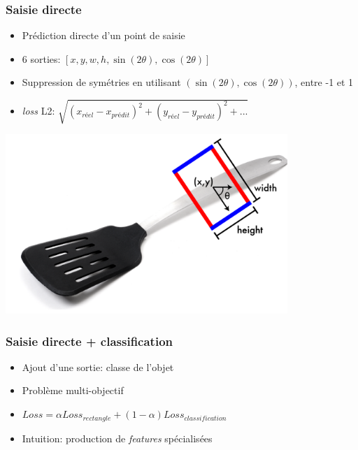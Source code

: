 \documentclass{beamer}
\begin{document}
\begin{frame}
  \frametitle{Saisie directe}
  \begin{itemize}
  \item Prédiction directe d'un point de saisie
  \item 6 sorties: $[x, y, w, h, \sin(2\theta), \cos(2\theta)]$
  \item Suppression de symétries en utilisant $(\sin(2\theta), \cos(2\theta))$,
    entre -1 et 1
  \item \emph{loss} L2: $\sqrt{(x_{réel} - x_{prédit})^2 + (y_{réel} - y_{prédit})^2
    + ...}$
  \end{itemize}
  
\end{frame}

\begin{frame}
    \includegraphics[width=0.8\textwidth]{img/grasp_rectangle.png}
\end{frame}

\begin{frame}
  \frametitle{Saisie directe + classification}
  \begin{itemize}
  \item Ajout d'une sortie: classe de l'objet
  \item Problème multi-objectif
  \item $Loss = \alpha Loss_{rectangle} + (1 - \alpha) Loss_{classification}$
  \item Intuition: production de \emph{features} spécialisées
  \end{itemize}
\end{frame}
\end{document}
